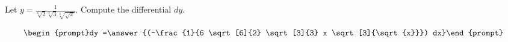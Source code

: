 \documentclass{ximera}
\author{Bart Snapp}
\begin{document}
\begin{exercise}

Let $y= \frac{1}{\sqrt[6]{2} \sqrt[3]{3} \sqrt[3]{\sqrt{x}}}$. Compute the differential $dy$.

\[
\begin{prompt}dy =\answer{(-\frac{1}{6 \sqrt[6]{2} \sqrt[3]{3} x \sqrt[3]{\sqrt{x}}}) dx}\end{prompt}
\]
\end{exercise}
\end{document}
